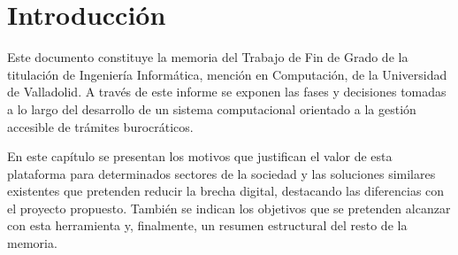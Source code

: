 \documentclass[12pt, a4paper, twoside]{report}
\begin{document}

\newpage
    \thispagestyle{empty}
    \null
\newpage

\begin{abstract}

    Hoy en día se considera indispensable la conexión a Internet para realizar tareas cotidianas, aunque todavía existe un sector de la población que permanece al margen de estas tecnologías.
    
    Este desarrollo presenta una solución accesible que puede ser utilizada por cualquier persona sin necesidad de conocimientos técnicos y disponiendo únicamente de una línea telefónica. Para ello, se han simulado distintos procedimientos administrativos que se llevan a cabo automáticamente, mediante un agente conversacional de inteligencia artificial que responde la llamada, recopila la información necesaria e inicia la automatización del proceso.
    
    Este trabajo demuestra que es posible reducir la brecha digital ofreciendo un servicio alternativo, que actúa como intermediario entre las personas y la Administración digital. De esta manera se sientan las bases para futuras propuestas inclusivas capaces de integrar a colectivos excluidos del entorno digital.
\end{abstract}

\tableofcontents
\listoffigures
\listoftables
\newpage

\chapter{Introducción}
    Este documento constituye la memoria del Trabajo de Fin de Grado de la titulación de Ingeniería Informática, mención en Computación, de la Universidad de Valladolid. 
    A través de este informe se exponen las fases y decisiones tomadas a lo largo del desarrollo de un sistema computacional orientado a la gestión accesible de trámites burocráticos.
    
    En este capítulo se presentan los motivos que justifican el valor de esta plataforma para determinados sectores de la sociedad y las soluciones similares existentes que pretenden reducir la brecha digital, destacando las diferencias con el proyecto propuesto. 
    También se indican los objetivos que se pretenden alcanzar con esta herramienta y, finalmente, un resumen estructural del resto de la memoria.
\end{document}
